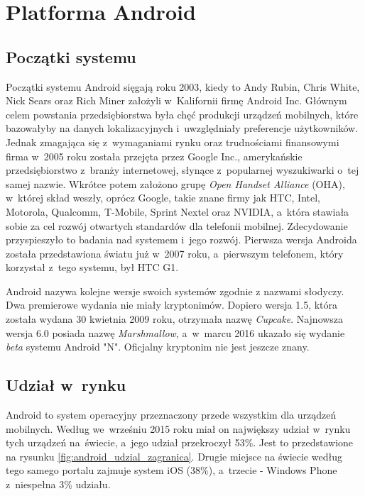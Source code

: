 \chapter{Platforma Android}

\section{Początki systemu}
Początki systemu Android sięgają roku 2003, kiedy to Andy Rubin, Chris White, Nick Sears oraz Rich Miner założyli w~Kalifornii firmę Android Inc. Głównym celem powstania przedsiębiorstwa była chęć produkcji urządzeń mobilnych, które bazowałyby na danych lokalizacyjnych i~uwzględniały preferencje użytkowników. Jednak zmagająca się z~wymaganiami rynku oraz trudnościami finansowymi firma w~2005 roku została przejęta przez Google Inc., amerykańskie przedsiębiorstwo z~branży internetowej, słynące z~popularnej wyszukiwarki o~tej samej nazwie. Wkrótce potem założono grupę \textit{Open Handset Alliance} (OHA), w~której skład weszły, oprócz Google, takie znane firmy jak HTC, Intel, Motorola, Qualcomm, T-Mobile, Sprint Nextel oraz NVIDIA, a~która stawiała sobie za cel rozwój otwartych standardów dla telefonii mobilnej. Zdecydowanie przyspieszyło to badania nad systemem i~jego rozwój. Pierwsza wersja Androida została przedstawiona światu już w~2007 roku, a~pierwszym telefonem, który korzystał z~tego systemu, był HTC G1.

Android nazywa kolejne wersje swoich systemów zgodnie z nazwami słodyczy. Dwa premierowe wydania nie miały kryptonimów. Dopiero wersja 1.5, która została wydana 30 kwietnia 2009 roku, otrzymała nazwę \textit{Cupcake}. Najnowsza wersja 6.0 posiada nazwę \textit{Marshmallow}, a~w~marcu 2016 ukazało się wydanie \textit{beta} systemu Android "N". Oficjalny kryptonim nie jest jeszcze znany.

\section{Udział w~rynku}
Android to system operacyjny przeznaczony przede wszystkim dla urządzeń mobilnych. Według \cite{website:android:stat2} we~wrześniu 2015 roku miał on największy udział w~rynku tych urządzeń na~świecie, a~jego udział przekroczył 53\%. Jest to przedstawione na rysunku \ref{fig:android_udzial_zagranica}. Drugie miejsce na świecie według tego samego portalu zajmuje system iOS (38\%), a~trzecie - Windows Phone z~niespełna 3\% udziału. 


